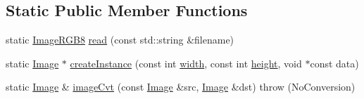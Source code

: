 \subsection*{Static Public Member Functions}
\begin{DoxyCompactItemize}
\item 
static \hyperlink{classcolorspaces_1_1_image_r_g_b8}{Image\+R\+G\+B8} \hyperlink{classcolorspaces_1_1_image_r_g_b8_a2c9fa30ed6fad3cea3f9c8efe431a694}{read} (const std\+::string \&filename)
\item 
static \hyperlink{classcolorspaces_1_1_image}{Image} $\ast$ \hyperlink{classcolorspaces_1_1_image_r_g_b8_ab71cd6e6837845cd0c43ac03e3a86297}{create\+Instance} (const int \hyperlink{classcolorspaces_1_1_image_ab80af7d4797110c23ed575b329ec7c4f}{width}, const int \hyperlink{classcolorspaces_1_1_image_a99a05ebd37f61215b2c3042ecaefdbfc}{height}, void $\ast$const data)
\item 
static \hyperlink{classcolorspaces_1_1_image}{Image} \& \hyperlink{classcolorspaces_1_1_image_r_g_b8_ac26f79bdedd29a4ab1ee6f9ac0abd928}{image\+Cvt} (const \hyperlink{classcolorspaces_1_1_image}{Image} \&src, \hyperlink{classcolorspaces_1_1_image}{Image} \&dst)  throw (\+No\+Conversion)
\end{DoxyCompactItemize}
